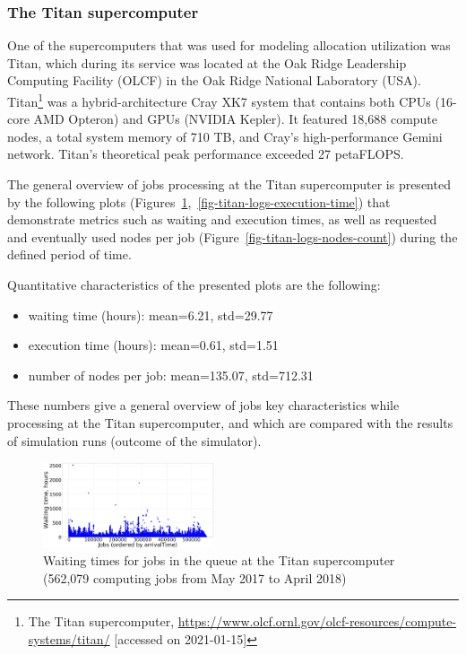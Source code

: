\subsubsection{The Titan supercomputer}
\label{sec-experiments-1-1}

One of the supercomputers that was used for modeling allocation utilization was Titan, which during its service was located at the Oak Ridge Leadership Computing Facility (OLCF) in the Oak Ridge National Laboratory (USA). Titan\footnote{The Titan supercomputer, \url{https://www.olcf.ornl.gov/olcf-resources/compute-systems/titan/} [accessed on 2021-01-15]} was a hybrid-architecture Cray XK7 system that contains both CPUs (16-core AMD Opteron) and GPUs (NVIDIA Kepler). It featured 18,688 compute nodes, a total system memory of 710 TB, and Cray's high-performance Gemini network. Titan's theoretical peak performance exceeded 27 petaFLOPS.

The general overview of jobs processing at the Titan supercomputer is presented by the following plots (Figures~\ref{fig-titan-logs-waiting-time},~\ref{fig-titan-logs-execution-time}) that demonstrate metrics such as waiting and execution times, as well as requested and eventually used nodes per job (Figure~\ref{fig-titan-logs-nodes-count}) during the defined period of time.

Quantitative characteristics of the presented plots are the following:
\begin{itemize}
    \item waiting time (hours): mean=6.21, std=29.77
    \item execution time (hours): mean=0.61, std=1.51
    \item number of nodes per job: mean=135.07, std=712.31
\end{itemize}
These numbers give a general overview of jobs key characteristics while processing at the Titan supercomputer, and which are compared with the results of simulation runs (outcome of the simulator).

\begin{figure}
    \centering
    \includegraphics[width=0.45\textwidth]{pics/titan-logs-waiting-time.png}
    \caption{Waiting times for jobs in the queue at the Titan supercomputer (562,079 computing jobs from May 2017 to April 2018)}
    \label{fig-titan-logs-waiting-time} 
\end{figure}

